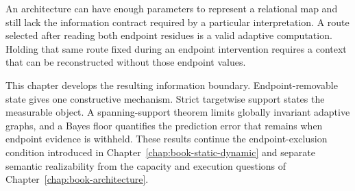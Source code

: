 An architecture can have enough parameters to represent a relational map and still lack the
information contract required by a particular interpretation.  A route selected after reading both
endpoint residues is a valid adaptive computation.  Holding that same route fixed during an
endpoint intervention requires a context that can be reconstructed without those endpoint values.

This chapter develops the resulting information boundary.  Endpoint-removable state gives one
constructive mechanism.  Strict targetwise support states the measurable object.  A spanning-support
theorem limits globally invariant adaptive graphs, and a Bayes floor quantifies the prediction error
that remains when endpoint evidence is withheld.  These results continue the endpoint-exclusion
condition introduced in Chapter~\ref{chap:book-static-dynamic} and separate semantic realizability
from the capacity and execution questions of Chapter~\ref{chap:book-architecture}.
